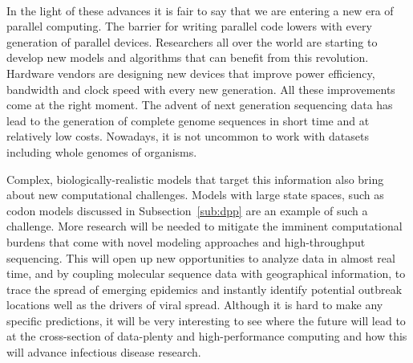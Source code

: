 \paragraph{}
In the light of these advances it is fair to say that we are entering a new era of parallel computing.
The barrier for writing parallel code lowers with every generation of parallel devices.
Researchers all over the world are starting to develop new models and algorithms that can benefit from this revolution.
Hardware vendors are designing new devices that improve power efficiency, bandwidth and clock speed with every new generation.
All these improvements come at the right moment.
The advent of next generation sequencing data has lead to the generation of complete genome sequences in short time and at relatively low costs.
Nowadays, it is not uncommon to work with datasets including whole genomes of organisms.

Complex, biologically-realistic models that target this information also bring about new computational challenges.
Models with large state spaces, such as codon models discussed in Subsection~\ref{sub:dpp} are an example of such a challenge.
More research will be needed to mitigate the imminent computational burdens that come with novel modeling approaches and high-throughput sequencing. 
This will open up new opportunities to analyze data in almost real time, and by coupling molecular sequence data with geographical information, to trace the spread of emerging epidemics and instantly identify potential outbreak locations well as the drivers of viral spread.  
Although it is hard to make any specific predictions, it will be very interesting to see where the future will lead to at the cross-section of data-plenty and high-performance computing and how this will advance infectious disease research.
















